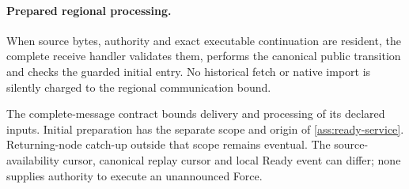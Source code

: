 \documentclass[11pt,a4paper]{article}
\begin{document}
\paragraph{Prepared regional processing.}
\label{sec:source-step-timing}
When source bytes, authority and exact executable continuation are
resident, the complete receive handler validates them, performs the
canonical public transition and checks the guarded initial entry.
No historical fetch or native import is silently charged to the
regional communication bound.

The complete-message contract bounds delivery and processing of its
declared inputs. Initial preparation has the separate scope and origin
of \cref{ass:ready-service}. Returning-node catch-up outside that scope
remains eventual. The source-availability cursor, canonical replay
cursor and local Ready event can differ; none supplies authority to
execute an unannounced Force.
\end{document}
